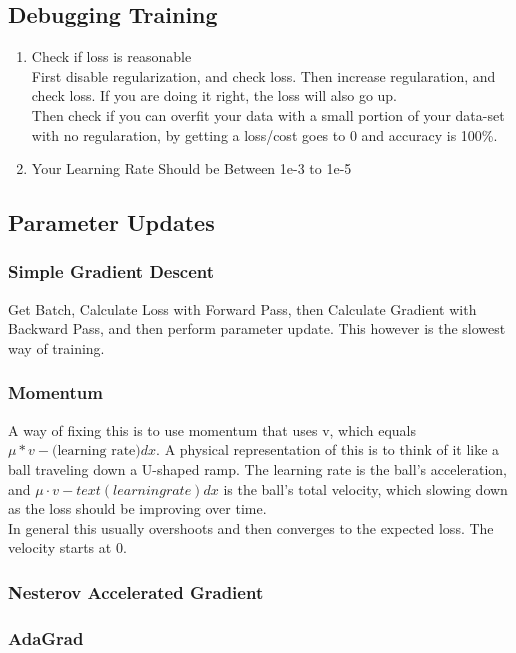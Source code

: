 \documentclass[11pt]{article}
\begin{document}
\begin{enumerate}
\subsection{Debugging Training}
\label{sec-2-7}
\begin{enumerate}
\item Check if loss is reasonable \\
\label{sec-2-7-0-1}
First disable regularization, and check loss. Then increase regularation, and check loss. If you are doing it right, the loss will
also go up. \\ Then check if you can overfit your data with a small portion of your data-set with no regularation, by getting
a loss/cost goes to 0 and accuracy is 100\%.
\item Your Learning Rate Should be Between 1e-3 to 1e-5
\label{sec-2-7-0-2}
\end{enumerate}
\subsection{Parameter Updates}
\label{sec-2-8}
\subsubsection{Simple Gradient Descent}
\label{sec-2-8-1}
Get Batch, Calculate Loss with Forward Pass, then Calculate Gradient with Backward Pass, and then perform parameter update. 
This however is the slowest way of training.
\subsubsection{Momentum}
\label{sec-2-8-2}
A way of fixing this is to use momentum that uses v, which equals $\mu * v - \text{(learning rate)}dx$. A physical representation
of this is to think of it like a ball traveling down a U-shaped ramp. The learning rate is the ball's acceleration, 
and $\mu·v - text{(learning rate)}dx$ is the ball's total velocity, which slowing down as the loss should be improving over time. \\
In general this usually overshoots and then converges to the expected loss. The velocity starts at 0.
\subsubsection{Nesterov Accelerated Gradient}
\label{sec-2-8-3}
\subsubsection{AdaGrad}
\label{sec-2-8-4}

\end{enumerate}
\end{document}
